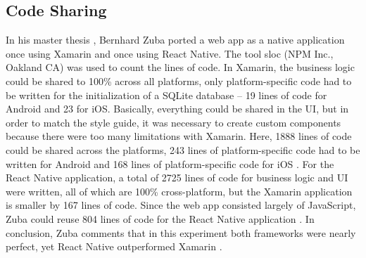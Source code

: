 \documentclass[Bachelor,BIF,english]{twbook}
\begin{document}
\subsection{Code Sharing}
In his master thesis \cite{ZubaBernhard2017EdPb}, Bernhard Zuba ported a web app as a native application once using Xamarin and once using React Native. The tool sloc (NPM Inc., Oakland CA) was used to count the lines of code. In Xamarin, the business logic could be shared to 100\% across all platforms, only platform-specific code had to be written for the initialization of a SQLite database – 19 lines of code for Android and 23 for iOS. Basically, everything could be shared in the UI, but in order to match the style guide, it was necessary to create custom components because there were too many limitations with Xamarin. Here, 1888 lines of code could be shared across the platforms, 243 lines of platform-specific code had to be written for Android and 168 lines of platform-specific code for iOS \cite[p.~71]{ZubaBernhard2017EdPb}. For the React Native application, a total of 2725 lines of code for business logic and UI were written, all of which are 100\% cross-platform, but the Xamarin application is smaller by 167 lines of code. Since the web app consisted largely of JavaScript, Zuba could reuse 804 lines of code for the React Native application \cite[p.~72]{ZubaBernhard2017EdPb}. In conclusion, Zuba comments that in this experiment both frameworks were nearly perfect, yet React Native outperformed Xamarin \cite[p.~72-73]{ZubaBernhard2017EdPb}.
\end{document}
